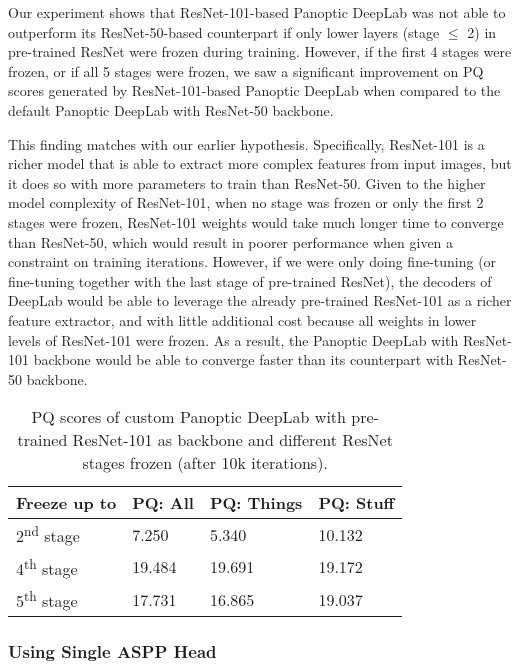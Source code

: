 \documentclass[10pt,twocolumn,letterpaper]{article}
\begin{document}
Our experiment shows that ResNet-101-based Panoptic DeepLab was not able to outperform its ResNet-50-based counterpart if only lower layers (stage $\leq$ 2) in pre-trained ResNet were frozen during training. However, if the first 4 stages were frozen, or if all 5 stages were frozen, we saw a significant improvement on PQ scores generated by ResNet-101-based Panoptic DeepLab when compared to the default Panoptic DeepLab with ResNet-50 backbone.

This finding matches with our earlier hypothesis. Specifically, ResNet-101 is a richer model that is able to extract more complex features from input images, but it does so with more parameters to train than ResNet-50. Given to the higher model complexity of ResNet-101, when no stage was frozen or only the first 2 stages were frozen, ResNet-101 weights would take much longer time to converge than ResNet-50, which would result in poorer performance when given a constraint on training iterations. However, if we were only doing fine-tuning (or fine-tuning together with the last stage of pre-trained ResNet), the decoders of DeepLab would be able to leverage the already pre-trained ResNet-101 as a richer feature extractor, and with little additional cost because all weights in lower levels of ResNet-101 were frozen. As a result, the Panoptic DeepLab with ResNet-101 backbone would be able to converge faster than its counterpart with ResNet-50 backbone. 

\begin{table}[htbp]\centering
\begin{tabular}{ || m{5em} | m{4em}| m{5em} | m{4em} || } 
  \hline
Freeze up to & PQ: All & PQ: Things & PQ: Stuff \\ 
  \hline
  2\textsuperscript{nd} stage & 7.250 & 5.340 & 10.132 \\ 
  \hline
  4\textsuperscript{th} stage & 19.484 & 19.691 & 19.172 \\ 
  \hline
  5\textsuperscript{th} stage & 17.731 & 16.865 & 19.037 \\ 
  \hline
\end{tabular}
\caption{PQ scores of custom Panoptic DeepLab with pre-trained ResNet-101 as backbone and different ResNet stages frozen (after 10k iterations).}
\label{tab:deeplab_resnet_101_freeze_2}
\end{table}

\subsubsection{Using Single ASPP Head}
\end{document}
